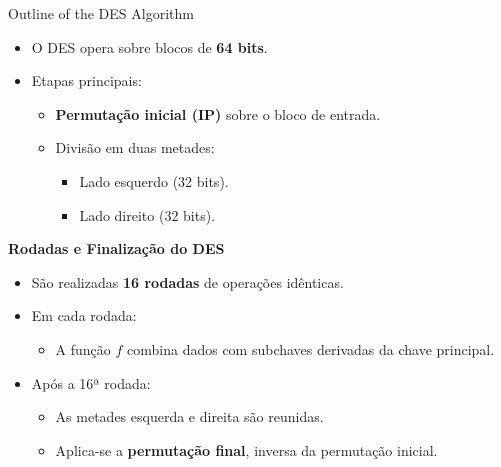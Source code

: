 \begin{frame}{Outline of the DES Algorithm}
    \begin{itemize}
        \item O DES opera sobre blocos de \textbf{64 bits}.
        \item Etapas principais:
        \begin{itemize}
            \item \textbf{Permutação inicial (IP)} sobre o bloco de entrada.
            \item Divisão em duas metades:
            \begin{itemize}
                \item Lado esquerdo (32 bits).
                \item Lado direito (32 bits).
            \end{itemize}
        \end{itemize}
    \end{itemize}


\textbf{Rodadas e Finalização do DES}
    \begin{itemize}
        \item São realizadas \textbf{16 rodadas} de operações idênticas.
        \item Em cada rodada:
        \begin{itemize}
            \item A função $f$ combina dados com subchaves derivadas da chave principal.
        \end{itemize}
        \item Após a 16ª rodada:
        \begin{itemize}
            \item As metades esquerda e direita são reunidas.
            \item Aplica-se a \textbf{permutação final}, inversa da permutação inicial.
        \end{itemize}
    \end{itemize}
\end{frame}


